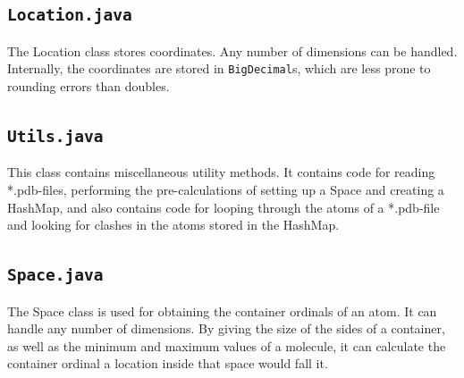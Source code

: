 \documentclass[a4paper]{article}
\begin{document}
\subsection*{\texttt{Location.java}}
The Location class stores coordinates. Any number of dimensions can be handled. Internally, the coordinates are stored in \texttt{BigDecimal}s, which are less prone to rounding errors than doubles.

\subsection*{\texttt{Utils.java}}
This class contains miscellaneous utility methods. It contains code for reading *.pdb-files, performing the pre-calculations of setting up a Space and creating a HashMap, and also contains code for looping through the atoms of a *.pdb-file and looking for clashes in the atoms stored in the HashMap.

\subsection*{\texttt{Space.java}}
The Space class is used for obtaining the container ordinals of an atom. It can handle any number of dimensions. By giving the size of the sides of a container, as well as the minimum and maximum values of a molecule, it can calculate the container ordinal a location inside that space would fall it.
\end{document}
